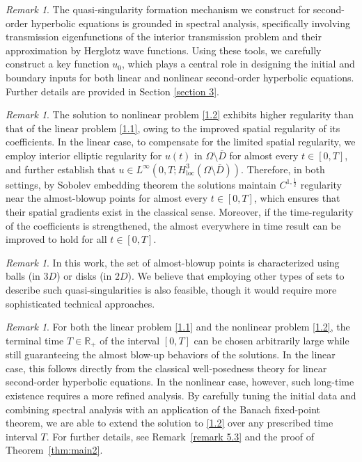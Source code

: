 \documentclass[11pt,reqno,oneside]{amsart}
\numberwithin{equation}{section}
\theoremstyle{definition}
\theoremstyle{remark}
\newtheorem{remark}[theorem]{Remark}
\numberwithin{equation}{section}
\begin{document}
	\begin{remark}
		The quasi-singularity formation mechanism we construct for second-order hyperbolic equations is grounded in spectral analysis, specifically involving transmission eigenfunctions of the interior transmission problem \cite{ColtonKress} and their approximation by Herglotz wave functions. Using these tools, we carefully construct a key function \( u_0 \), which plays a central role in designing the initial and boundary inputs for both linear and nonlinear second-order hyperbolic equations. Further details are provided in Section \ref{section 3}.
	\end{remark}
	
	\begin{remark}
		The solution to nonlinear problem \eqref{1.2} exhibits higher regularity than that of the linear problem \eqref{1.1}, owing to the improved spatial regularity of its coefficients. In the linear case, to compensate for the limited spatial regularity, we employ interior elliptic regularity for \( u(t) \) in \( \Omega \setminus \overline{D} \) for almost every \( t \in [0,T] \), and further establish that \( u \in L^{\infty}\left(0,T; H^{3}_{\mathrm{loc}}(\Omega \setminus \overline{D})\right) \). Therefore, in both settings, by Sobolev embedding theorem the solutions maintain \( C^{1,\frac{1}{2}} \) regularity near the almost-blowup points for almost every $t \in [0,T] $, which ensures that their spatial gradients exist in the classical sense. Moreover, if the time-regularity of the coefficients is strengthened, the almost everywhere in time result can be improved to hold for all \( t \in [0,T] \).
	\end{remark}
	
	\begin{remark}
		In this work, the set of almost-blowup points is characterized using balls (in $3D$) or disks (in $2D$). We believe that employing other types of sets to describe such quasi-singularities is also feasible, though it would require more sophisticated technical approaches.
	\end{remark}
	
	
	\begin{remark}
		For both the linear problem \eqref{1.1} and the nonlinear problem \eqref{1.2}, the terminal time $T \in \mathbb{R}_+$ of the interval $[0, T]$ can be chosen arbitrarily large while still guaranteeing the almost blow-up behaviors of the solutions. In the linear case, this follows directly from the classical well-posedness theory for linear second-order hyperbolic equations. In the nonlinear case, however, such long-time existence requires a more refined analysis. By carefully tuning the initial data and combining spectral analysis with an application of the Banach fixed-point theorem, we are able to extend the solution to \eqref{1.2} over any prescribed time interval $ T $. For further details, see Remark~\ref{remark 5.3} and the proof of Theorem~\ref{thm:main2}.
	\end{remark}
	
\end{document}
